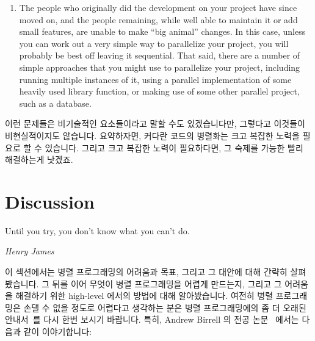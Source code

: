 {\begin{enumerate}
	\item	The people who originally did the development on your
		project have since moved on, and the people remaining,
		while well able to maintain it or add small features,
		are unable to make ``big animal'' changes.
		In this case, unless you can work out a very simple
		way to parallelize your project, you will probably
		be best off leaving it sequential.
		That said, there are a number of simple approaches that
		you might use
		to parallelize your project, including running multiple
		instances of it, using a parallel implementation of
		some heavily used library function, or making use of
		some other parallel project, such as a database.
	\fi
	\end{enumerate}

	이런 문제들은 비기술적인 요소들이라고 말할 수도 있겠습니다만, 그렇다고
	이것들이 비현실적이지도 않습니다.
	요약하자면, 커다란 코드의 병렬화는 크고 복잡한 노력을 필요로 할 수
	있습니다.
	그리고 크고 복잡한 노력이 필요하다면, 그 숙제를 가능한 빨리 해결하는게
	낫겠죠.

} \QuickQuizEnd

\section{Discussion}
\label{sec:intro:Discussion}
%
\epigraph{Until you try, you don't know what you can't do.}
	 {\emph{Henry James}}

이 섹션에서는 병렬 프로그래밍의 어려움과 목표, 그리고 그 대안에 대해 간략히
살펴봤습니다.
그 뒤를 이어 무엇이 병렬 프로그래밍을 어렵게 만드는지, 그리고 그 어려움을
해결하기 위한 high-level 에서의 방법에 대해 알아봤습니다.
여전히 병렬 프로그래밍은 손댈 수 없을 정도로 어렵다고 생각하는 분은 병렬
프로그래밍에의 좀 더 오래된
안내서~\cite{SQNTParallel,AndrewDBirrell1989Threads,Beck85,Inman85}를 다시 한번
보시기 바랍니다.
특히, Andrew Birrell 의 전공 논문~\cite{AndrewDBirrell1989Threads} 에서는
다음과 같이 이야기합니다:

